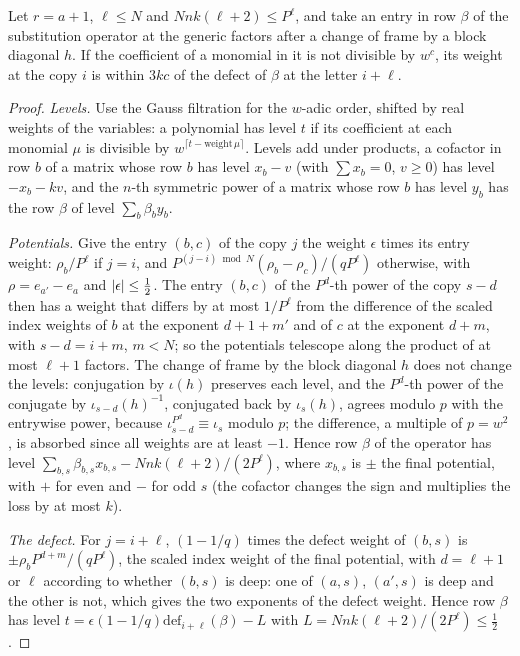 \begin{lemma}\label{lem:weight-defect}
Let $r=a+1$, $\ell\le N$ and $Nnk(\ell+2)\le P^\ell$, and take an entry in row $\beta$ of the substitution operator at the generic factors after a change of
frame by a block diagonal $h$. If the coefficient of a monomial in it is not divisible by $w^c$, its weight at the copy $i$ is within $3kc$ of the defect
of $\beta$ at the letter $i+\ell$.
\end{lemma}

\begin{proof}
\emph{Levels.} Use the Gauss filtration for the $w$-adic order, shifted by real weights of the variables: a polynomial has level $t$ if its coefficient at each monomial $\mu$ is divisible by $w^{\lceil t-\mathrm{weight}\,\mu\rceil}$. Levels add under products, a cofactor in row $b$ of a matrix whose row $b$ has level $x_b-v$ (with $\sum x_b=0$, $v\ge0$) has level $-x_b-kv$, and the $n$-th symmetric power of a matrix whose row $b$ has level $y_b$ has
the row $\beta$ of level $\sum_b\beta_by_b$.

\emph{Potentials.} Give the entry $(b,c)$ of the copy $j$ the weight $\epsilon$ times its entry weight: $\rho_b/P^\ell$ if $j=i$, and $P^{(j-i)\bmod N}(\rho_b-\rho_c)/(qP^\ell)$ otherwise, with $\rho=e_{a'}-e_a$ and $\lvert \epsilon\rvert\le\frac12$. The entry $(b,c)$ of the $P^d$-th power of the copy $s-d$ then has a weight that differs by at most $1/P^\ell$ from the difference of the scaled index weights of $b$ at the exponent $d+1+m'$ and of $c$
at the exponent $d+m$, with $s-d=i+m$, $m<N$; so the potentials telescope along the product of at most $\ell+1$ factors. The change of frame by the block diagonal $h$ does not change the levels: conjugation by $\iota(h)$ preserves each level, and the $P^d$-th power of the conjugate by $\iota_{s-d}(h)^{-1}$, conjugated back by $\iota_s(h)$, agrees modulo $p$ with the entrywise power, because $\iota_{s-d}^{P^d}\equiv\iota_s$ modulo $p$;
the difference, a multiple of $p=w^2$, is absorbed since all weights are at least $-1$. Hence row $\beta$ of the operator has level $\sum_{b,s}\beta_{b,s}x_{b,s}-Nnk(\ell+2)/(2P^\ell)$, where $x_{b,s}$ is $\pm$ the final potential, with $+$ for even and $-$ for odd $s$ (the cofactor changes the sign and multiplies the loss by at most $k$).

\emph{The defect.} For $j=i+\ell$, $(1-1/q)$ times the defect weight of $(b,s)$ is $\pm\rho_bP^{d+m}/(qP^\ell)$, the scaled index weight of the final potential, with $d=\ell+1$ or $\ell$ according to whether $(b,s)$ is deep: one of $(a,s)$, $(a',s)$ is deep and the other is not, which gives the two exponents of the defect weight. Hence row $\beta$ has level $t=\epsilon(1-1/q)\mathrm{def}_{i+\ell}(\beta)-L$ with
$L=Nnk(\ell+2)/(2P^\ell)\le\frac12$.


\end{proof}
